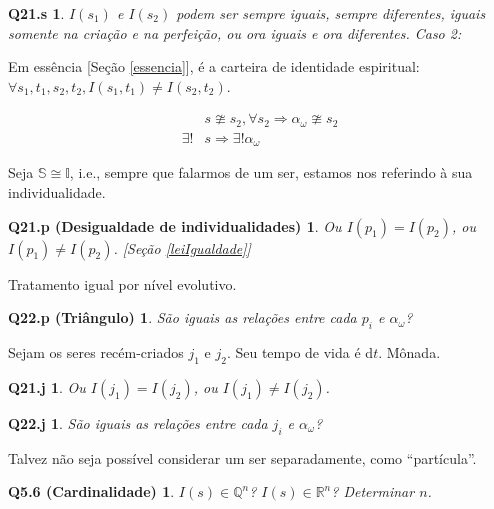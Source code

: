\documentclass[12pt,a4paper]{article}
\begin{document}
			\newtheorem{Q21.s}{Q21.s}
			\begin{Q21.s} $I(s_1)$ e $I(s_2)$ podem ser sempre iguais, sempre diferentes, iguais somente na cria\c{c}\~ao e na perfei\c{c}\~ao, ou ora iguais e ora diferentes. Caso 2:
			\end{Q21.s}

			Em ess\^encia [Se\c{c}\~ao \ref{essencia}], \'e a carteira de identidade espiritual: $\forall s_1, t_1, s_2, t_2, I(s_1, t_1) \neq I(s_2, t_2)$.

			\begin{align*}
				&s \ncong s_2, \forall s_2 \Rightarrow \alpha_\omega \ncong s_2 \\
				\exists ! &s \Rightarrow \exists ! \alpha_\omega
			\end{align*}

			Seja $ \mathbb{S} \cong \mathbb{I} $, i.e., sempre que falarmos de um ser, estamos nos referindo \`a sua individualidade.

			\newtheorem{Q21.p}{Q21.p (Desigualdade de individualidades)}
			\begin{Q21.p} Ou $ I(p_1) = I(p_2) $, ou $ I(p_1) \neq I(p_2) $. [Se\c{c}\~ao \ref{leiIgualdade}]
			\end{Q21.p}

			Tratamento igual por n\'ivel evolutivo.

			\newtheorem{Q22.p}{Q22.p (Tri\^angulo)}
			\begin{Q22.p} S\~ao iguais as rela\c{c}\~oes entre cada $ p_i $ e $ \alpha_\omega $?
			\end{Q22.p}

			Sejam os seres rec\'em-criados $ j_1 $ e $ j_2 $. Seu tempo de vida \'e d$t$. M\^onada.

			\newtheorem{Q21.j}{Q21.j}
			\begin{Q21.j} Ou $ I(j_1) = I(j_2) $, ou $ I(j_1) \neq I(j_2) $.
			\end{Q21.j}

			\newtheorem{Q22.j}{Q22.j}
			\begin{Q22.j} S\~ao iguais as rela\c{c}\~oes entre cada $ j_i $ e $ \alpha_\omega $?
			\end{Q22.j}

			Talvez n\~ao seja poss\'ivel considerar um ser separadamente, como \textquotedblleft part\'icula\textquotedblright.

			\newtheorem{Q5.6}{Q5.6 (Cardinalidade)}
			\begin{Q5.6} $I(s) \in \mathbb{Q}^n$? $I(s) \in \mathbb{R}^n$? Determinar $n$.
			\end{Q5.6}
\end{document}
